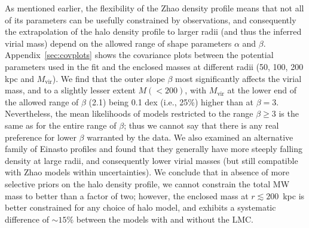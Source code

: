 \documentclass[usenatbib,fleqn]{mnras}
\begin{document}
As mentioned earlier, the flexibility of the Zhao density profile means that not all of its parameters can be usefully constrained by observations, and consequently the extrapolation of the halo density profile to larger radii (and thus the inferred virial mass) depend on the allowed range of shape parameters $\alpha$ and $\beta$. Appendix~\ref{sec:covplots} shows the covariance plots between the potential parameters used in the fit and the enclosed masses at different radii (50, 100, 200 kpc and $M_\text{vir}$). We find that the outer slope $\beta$ most significantly affects the virial mass, and to a slightly lesser extent $M(<200)$, with $M_\text{vir}$ at the lower end of the allowed range of $\beta$ (2.1) being 0.1 dex (i.e., 25\%) higher than at $\beta=3$. Nevertheless, the mean likelihoods of models restricted to the range $\beta\ge 3$ is the same as for the entire range of $\beta$; thus we cannot say that there is any real preference for lower $\beta$ warranted by the data. We also examined an alternative family of Einasto profiles and found that they generally have more steeply falling density at large radii, and consequently lower virial masses (but still compatible with Zhao models within uncertainties). We conclude that in absence of more selective priors on the halo density profile, we cannot constrain the total MW mass to better than a factor of two; however, the enclosed mass at $r\lesssim 200$~kpc is better constrained for any choice of halo model, and exhibits a systematic difference of $\sim 15\%$ between the models with and without the LMC.
\end{document}
